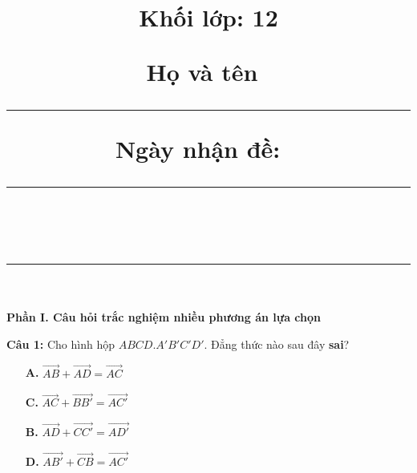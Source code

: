 \documentclass[12pt, a4paper]{article}
\title{\vspace{-1.5cm}{\huge\textbf{Ôn thi cuối kỳ I - Lần 1}}\\[3mm]
		{\LARGE Khối lớp: 12}\\[2mm]
{\normalsize Họ và tên~\rule{3cm}{1pt} \hfill Ngày nhận đề: ~\rule{3cm}{1pt}}\\[4mm]
\hrule
}
\author{}
\date{}
\begin{document}
	\maketitle
	\vspace{-2.15cm}
	
\textbf{Phần I. Câu hỏi trắc nghiệm nhiều phương án lựa chọn}

\textbf{Câu 1: } Cho hình hộp $ ABCD.A'B'C'D' $. Đẳng thức nào sau đây \textbf{sai}?
	\begin{multicols}{2}
		\begin{enumerate}
			\item[\textbf{A.}] $ \overrightarrow{AB} + \overrightarrow{AD} = \overrightarrow{AC} $
			\item[\textbf{C.}] $ \overrightarrow{AC} + \overrightarrow{BB'} = \overrightarrow{AC'} $
			\item[\textbf{B.}] $ \overrightarrow{AD} + \overrightarrow{CC'} = \overrightarrow{AD'} $
			\item[\textbf{D.}] $ \overrightarrow{AB'} + \overrightarrow{CB} = \overrightarrow{AC'} $
		\end{enumerate}
	\end{multicols}
	
\vspace{-1cm}
\end{document}
